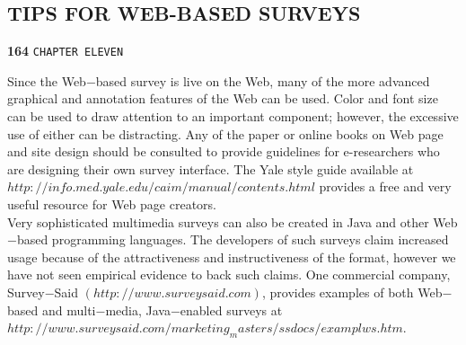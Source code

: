 \documentclass[8pt]{beamer}
\begin{document}
\begin{frame}
\section*{TIPS FOR WEB-BASED SURVEYS}
\begin{flushleft}
\textbf{164}\hspace*{1cm} \texttt{CHAPTER ELEVEN}
\end{flushleft}

\vspace*{0.5cm}
\hspace*{0.5cm} Since the Web$-$based survey is live on the Web, many of the more advanced graphical and annotation features of the Web can be used. Color and font size can be used to draw attention to an important component; however, the excessive use of either can be distracting. Any of the paper or online books on Web page and site design should be consulted to provide guidelines for e-researchers who are designing their own survey interface. The Yale style guide available at $http://info.med.yale.edu/caim/manual/contents.html$ provides a free and very useful resource for Web page creators.\\
\hspace*{0.5cm} Very sophisticated multimedia surveys can also be created in Java and other Web$-$based programming languages. The developers of such surveys claim increased usage because of the attractiveness and instructiveness of the format, however we have not seen empirical evidence to back such claims. One commercial company, Survey$-$Said $(http://www.surveysaid.com)$, provides examples of both Web$-$based and multi$-$media, Java$-$enabled surveys at $http://www.surveysaid.com/marketing_masters/ssdocs/examplws.htm$.\\
\end{frame}
\end{document}
